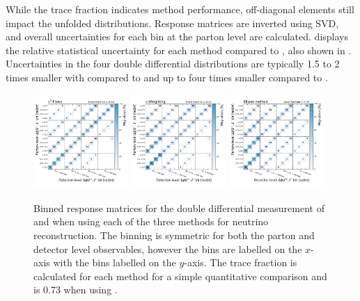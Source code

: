 While the trace fraction indicates method performance, off-diagonal elements still impact the unfolded distributions.
Response matrices are inverted using SVD, and overall uncertainties for each bin at the parton level are calculated.
 displays the relative statistical uncertainty for each method compared to \vtruth, also shown in .
Uncertainties in the four double differential distributions are typically 1.5 to 2 times smaller with \vvflows compared to \vweight and up to four times smaller compared to \ellipse.

\begin{figure}[htp]
    \includegraphics[width=0.32\textwidth]{Figures/neutrino_unfolding/unfolding/unfold_lep_delphi_transformer_encoder.pdf}
    \includegraphics[width=0.32\textwidth]{Figures/neutrino_unfolding/unfolding/unfold_lep_delphi_nu_weighting.pdf}
    \includegraphics[width=0.32\textwidth]{Figures/neutrino_unfolding/unfolding/unfold_lep_delphi_nu_ellipse.pdf}
    \caption{Binned response matrices for the double differential measurement of \mttbar and \dphill when using each of the three methods for neutrino reconstruction. The binning is symmetric for both the parton and detector level observables, however the \mttbar bins are labelled on the $x$-axis with the \dphill bins labelled on the $y$-axis.
        The trace fraction is calculated for each method for a simple quantitative comparison and is 0.73 when using \vtruth.}
    \label{fig:unfold_dphill}
\end{figure}

